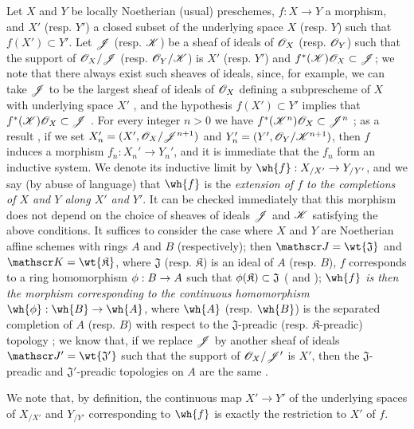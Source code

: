 \begin{env}[10.9.1]
\label{1.10.9.1}
Let $X$ and $Y$ be locally Noetherian (usual) preschemes, $f:X\to Y$ a morphism, and $X'$ (resp. $Y'$) a closed subset of the underlying space $X$ (resp. $Y$) such that $f(X')\subset Y'$.
Let $\mathscr{J}$ (resp. $\mathscr{K}$) be a sheaf of ideals of $\mathscr{O}_X$ (resp. $\mathscr{O}_Y$) such that the support of $\mathscr{O}_X/\mathscr{J}$ (resp. $\mathscr{O}_Y/\mathscr{K}$) is $X'$ (resp. $Y'$) and $f^*(\mathscr{K})\mathscr{O}_X\subset\mathscr{J}$; we note that there always exist such sheaves of ideals, since, for example, we can take $\mathscr{J}$ to be the largest sheaf of ideals of $\mathscr{O}_X$ defining a subprescheme of $X$ with underlying space $X'$ , and the hypothesis $f(X')\subset Y'$ implies that $f^*(\mathscr{K})\mathscr{O}_X\subset\mathscr{J}$ .
For every integer $n>0$ we have $f^*(\mathscr{K}^n)\mathscr{O}_X\subset\mathscr{J}^n$ ; as a result , if we set $X_n'=(X',\mathscr{O}_X/\mathscr{J}^{n+1})$ and $Y_n'=(Y',\mathscr{O}_Y/\mathscr{K}^{n+1})$, then $f$ induces a morphism $f_n:X_n'\to Y_n'$, and it is immediate that the $f_n$ form an inductive system.
We denote its inductive limit  by $\wh{f}:X_{/X'}\to Y_{/Y'}$, and we say (by abuse of language) that $\wh{f}$ is the \emph{extension of $f$ to the completions of $X$ and $Y$ along $X'$ and $Y'$}.
It can be checked immediately that this morphism does not depend on the choice of sheaves of ideals $\mathscr{J}$ and $\mathscr{K}$ satisfying the above conditions.
It suffices to consider the case where $X$ and $Y$ are Noetherian affine schemes with rings $A$ and $B$ (respectively); then $\sh{J}=\wt{\mathfrak{J}}$ and $\sh{K}=\wt{\mathfrak{K}}$, where $\mathfrak{J}$ (resp. $\mathfrak{K}$) is an ideal of $A$ (resp. $B$), $f$ corresponds to a ring homomorphism $\vphi:B\to A$ such that $\phi(\mathfrak{K})\subset\mathfrak{J}$ ( and ); \emph{$\wh{f}$ is then the morphism corresponding  to the continuous homomorphism $\wh{\vphi}:\wh{B}\to\wh{A}$}, where $\wh{A}$ (resp. $\wh{B}$) is the separated completion of $A$ (resp. $B$) with respect to the $\mathfrak{J}$-preadic (resp. $\mathfrak{K}$-preadic) topology ; we know that, if we replace $\mathscr{J}$ by another
sheaf of ideals $\sh{J}'=\wt{\mathfrak{J}'}$ such that the support of $\mathscr{O}_X/\mathscr{J}'$ is $X'$, then the $\mathfrak{J}$-preadic and $\mathfrak{J}'$-preadic topologies on $A$ are the same .

We note that, by definition, the continuous map $X'\to Y'$ of the underlying spaces of $X_{/X'}$ and $Y_{/Y'}$ corresponding to $\wh{f}$ is exactly the restriction to $X'$ of $f$.
\end{env}

